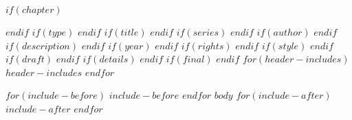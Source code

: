 $if(chapter)$
\setcounter{chapter}{$chapter$}
\addtocounter{chapter}{-1}
$endif$
$if(type)$
\renewcommand{\bookgentype}{$type$}
$endif$
$if(title)$
\renewcommand{\titleinfo}{$title$}
$endif$
$if(series)$
\renewcommand{\seriesinfo}{$series$}
$endif$
$if(author)$
\renewcommand{\authorinfo}{$author$}
$endif$
$if(description)$
\renewcommand{\descriptioninfo}{$description$}
$endif$
$if(year)$
\renewcommand{\yearinfo}{$year$}
$endif$
$if(rights)$
\renewcommand{\rightsinfo}{$rights$}
$endif$
$if(style)$
\renewcommand{\editioninfo}{\capitalisewords{$style$}}
$endif$
$if(draft)$
\renewcommand{\draftinfo}{$draft$}
$endif$
$if(details)$
\renewcommand{\detailsinfo}{$details$}
$endif$
$if(final)$
\DraftOff
$endif$
$for(header-includes)$
$header-includes$
$endfor$

$for(include-before)$
$include-before$
$endfor$
$body$
$for(include-after)$
$include-after$
$endfor$
